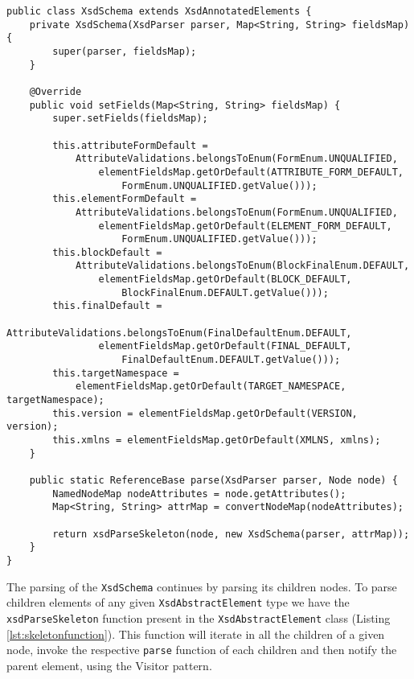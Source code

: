 \begin{lstlisting}[caption={XsdSchema Information Extraction (Simplified)},captionpos=b,label={lst:xsdschemaparsing}]
public class XsdSchema extends XsdAnnotatedElements {
    private XsdSchema(XsdParser parser, Map<String, String> fieldsMap){
        super(parser, fieldsMap);
    }
    
    @Override
    public void setFields(Map<String, String> fieldsMap) {
        super.setFields(fieldsMap);

        this.attributeFormDefault = 
        	AttributeValidations.belongsToEnum(FormEnum.UNQUALIFIED, 				
        		elementFieldsMap.getOrDefault(ATTRIBUTE_FORM_DEFAULT, 
        			FormEnum.UNQUALIFIED.getValue()));
        this.elementFormDefault = 			 
        	AttributeValidations.belongsToEnum(FormEnum.UNQUALIFIED, 		
        		elementFieldsMap.getOrDefault(ELEMENT_FORM_DEFAULT, 	
        			FormEnum.UNQUALIFIED.getValue()));
        this.blockDefault = 		
            AttributeValidations.belongsToEnum(BlockFinalEnum.DEFAULT, 		
        		elementFieldsMap.getOrDefault(BLOCK_DEFAULT, 	
        			BlockFinalEnum.DEFAULT.getValue()));
        this.finalDefault = 
            AttributeValidations.belongsToEnum(FinalDefaultEnum.DEFAULT, 
        		elementFieldsMap.getOrDefault(FINAL_DEFAULT, 
        			FinalDefaultEnum.DEFAULT.getValue()));
        this.targetNamespace = 
        	elementFieldsMap.getOrDefault(TARGET_NAMESPACE, targetNamespace);
        this.version = elementFieldsMap.getOrDefault(VERSION, version);
        this.xmlns = elementFieldsMap.getOrDefault(XMLNS, xmlns);
    }
    
    public static ReferenceBase parse(XsdParser parser, Node node) {
        NamedNodeMap nodeAttributes = node.getAttributes();
        Map<String, String> attrMap = convertNodeMap(nodeAttributes);        
    
        return xsdParseSkeleton(node, new XsdSchema(parser, attrMap));
    }
}
\end{lstlisting}

\noindent
The parsing of the \texttt{XsdSchema} continues by parsing its children nodes. To parse children elements of any given \texttt{XsdAbstractElement} type we have the \texttt{xsdParseSkeleton} function present in the \texttt{XsdAbstractElement} class (Listing \ref{lst:skeletonfunction}). This function will iterate in all the children of a given node, invoke the respective \texttt{parse} function of each children and then notify the parent element, using the Visitor pattern\cite{gamma1994design}. 

